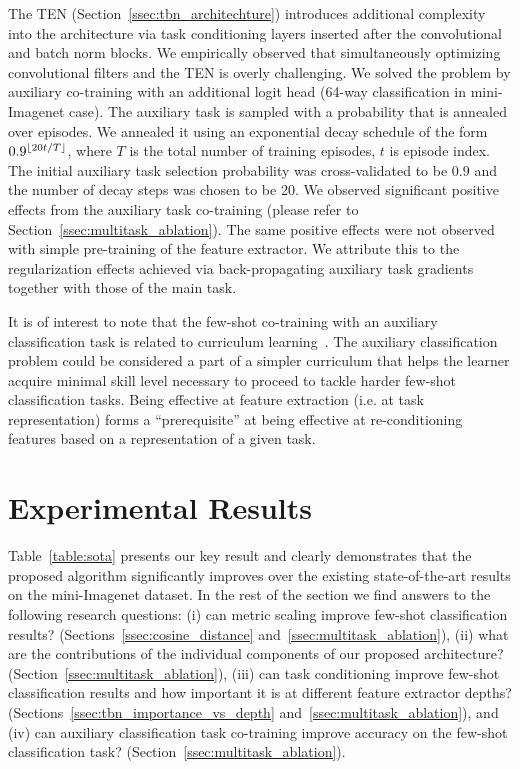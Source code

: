 \documentclass{article}
\DeclarePairedDelimiter\floor{\lfloor}{\rfloor}
\begin{document}
The TEN (Section~\ref{ssec:tbn_architechture}) introduces additional complexity into the architecture via task conditioning layers inserted after the convolutional and batch norm blocks. We empirically observed that simultaneously optimizing convolutional filters and the TEN is overly challenging. We solved the problem by auxiliary co-training with an additional logit head (64-way classification in mini-Imagenet case). The auxiliary task is sampled with a probability that is annealed over episodes. We annealed it using an exponential decay schedule of the form $0.9^{\floor{20t/T}}$, where $T$ is the total number of training episodes, $t$ is episode index. The initial auxiliary task selection probability was cross-validated to be $0.9$ and the number of decay steps was chosen to be 20. We observed significant positive effects from the auxiliary task co-training (please refer to Section~\ref{ssec:multitask_ablation}). The same positive effects were not observed with simple pre-training of the feature extractor. We attribute this to the regularization effects achieved via back-propagating auxiliary task gradients together with those of the main task.

It is of interest to note that the few-shot co-training with an auxiliary classification task is related to curriculum learning~\citep{Santoro16metalearning}. The auxiliary classification problem could be considered a part of a simpler curriculum that helps the learner acquire minimal skill level necessary to proceed to tackle harder few-shot classification tasks. Being effective at feature extraction (i.e. at task representation) forms a ``prerequisite'' at being effective at re-conditioning features based on a representation of a given task.

\section{Experimental Results}\label{sec:experiments}


Table~\ref{table:sota} presents our key result and clearly demonstrates that the proposed algorithm significantly improves over the existing state-of-the-art results on the mini-Imagenet dataset. In the rest of the section we find answers to the following research questions: (i) can metric scaling improve few-shot classification results? (Sections~\ref{ssec:cosine_distance} and~\ref{ssec:multitask_ablation}), (ii) what are the contributions of the individual components of our proposed architecture? (Section~\ref{ssec:multitask_ablation}), (iii) can task conditioning improve few-shot classification results and how important it is at different feature extractor depths? (Sections~\ref{ssec:tbn_importance_vs_depth} and~\ref{ssec:multitask_ablation}), and (iv) can auxiliary classification task co-training improve accuracy on the few-shot classification task? (Section~\ref{ssec:multitask_ablation}).
\end{document}
